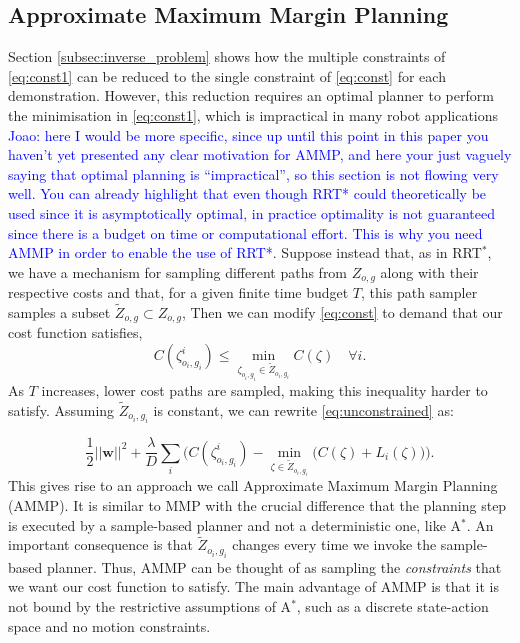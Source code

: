 \documentclass[letterpaper, 10 pt, conference]{ieeeconf}
\newcommand{\jm}[1]{\textcolor{blue}{Joao: #1}}
\begin{document}
	\subsection{Approximate Maximum Margin Planning \label{subsec:ammp}}

Section \ref{subsec:inverse_problem} shows how the multiple constraints of \eqref{eq:const1} can be reduced to the single constraint of \eqref{eq:const} for each demonstration. However, this reduction requires an optimal planner to perform the minimisation in \eqref{eq:const1}, which is impractical in many robot applications \jm{here I would be more specific, since up until this point in this paper you haven't yet presented any clear motivation for AMMP, and here your just vaguely saying that optimal planning is ``impractical'', so this section is not flowing very well. You can already highlight that even though RRT* could theoretically be used since it is asymptotically optimal, in practice optimality is not guaranteed since there is a budget on time or computational effort. This is why you need AMMP in order to enable the use of RRT*}. Suppose instead that, as in RRT$^*$, we have a mechanism for sampling different paths from $Z_{o,g}$ along with their respective costs and that, for a given finite time budget $T$, this path sampler samples a subset $\tilde{Z}_{o,g} \subset Z_{o,g}$,  Then we can modify \eqref{eq:const} to demand that our cost function satisfies,
\begin{equation}
	C(\zeta^i_{o_i,g_i}) \leq \min_{\zeta_{o_i,g_i} \in \tilde{Z}_{o_i,g_i}} C(\zeta) \quad \forall i. \label{eq:const_rrt}
\end{equation}
	As $T$ increases, lower cost paths are sampled, making this inequality harder to satisfy. Assuming $\tilde{Z}_{o_i,g_i}$ is constant, we can rewrite \eqref{eq:unconstrained} as:

	\begin{equation} \frac{1}{2}||\mathbf{w}||^2 + \frac{\lambda}{D} \sum_i \big( C(\zeta^i_{o_i,g_i}) - \min_{\zeta \in \tilde{Z}_{o_i,g_i}}\big(C(\zeta) + L_i(\zeta)\big) \big). \label{eq:unconstrained_rrt}
	\end{equation}
This gives rise to an approach we call Approximate Maximum Margin Planning (AMMP). It is similar  to MMP with the crucial difference that the planning step is executed by a sample-based planner and not a deterministic one, like A$^*$. An important consequence is that $\tilde{Z}_{o_i,g_i}$ changes every time we invoke the sample-based planner. Thus, AMMP can be thought of as sampling the \emph{constraints} that we want our cost function to satisfy. The main advantage of AMMP is that it is not bound by the restrictive assumptions of  A$^*$, such as a discrete state-action space and no motion constraints. 
\end{document}
